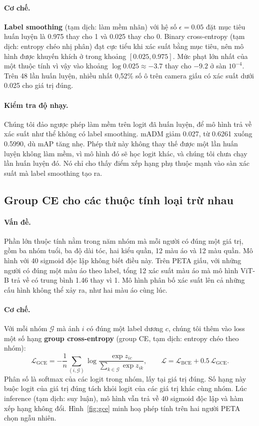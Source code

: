 \documentclass[11pt,a4paper]{article}
\begin{document}
\paragraph{Cơ chế.} \textbf{Label smoothing} (tạm dịch: làm mềm nhãn) với hệ số $\epsilon=0.05$ đặt mục tiêu huấn luyện là 0.975 thay cho 1 và 0.025 thay cho 0. Binary cross-entropy (tạm dịch: entropy chéo nhị phân) đạt cực tiểu khi xác suất bằng mục tiêu, nên mô hình được khuyến khích ở trong khoảng $[0.025, 0.975]$. Mức phạt lớn nhất của một thuộc tính vì vậy vào khoảng $\log 0.025\approx-3.7$ thay cho $-9.2$ ở sàn $10^{-4}$. Trên 48 lần huấn luyện, nhiều nhất 0,52\% số ô trên camera giấu có xác suất dưới 0.025 cho giá trị đúng.

\paragraph{Kiểm tra độ nhạy.} Chúng tôi đảo ngược phép làm mềm trên logit đã huấn luyện, để mô hình trả về xác suất như thể không có label smoothing. mADM giảm 0.027, từ 0.6261 xuống 0.5990, dù mAP tăng nhẹ. Phép thử này không thay thế được một lần huấn luyện không làm mềm, vì mô hình đó sẽ học logit khác, và chúng tôi chưa chạy lần huấn luyện đó. Nó chỉ cho thấy điểm xếp hạng phụ thuộc mạnh vào sàn xác suất mà label smoothing tạo ra.

\subsection{Group CE cho các thuộc tính loại trừ nhau}
\label{sec:gce}

\paragraph{Vấn đề.} Phần lớn thuộc tính nằm trong năm nhóm mà mỗi người có đúng một giá trị, gồm ba nhóm tuổi, ba độ dài tóc, hai kiểu quần, 12 màu áo và 12 màu quần. Mô hình với 40 sigmoid độc lập không biết điều này. Trên PETA giấu, với những người có đúng một màu áo theo label, tổng 12 xác suất màu áo mà mô hình ViT-B trả về có trung bình 1.46 thay vì 1. Mô hình phân bố xác suất lên cả những cấu hình không thể xảy ra, như hai màu áo cùng lúc.

\paragraph{Cơ chế.} Với mỗi nhóm $\mathcal{G}$ mà ảnh $i$ có đúng một label dương $c$, chúng tôi thêm vào loss một số hạng \textbf{group cross-entropy} (group CE, tạm dịch: entropy chéo theo nhóm):
\begin{equation}
\mathcal{L}_{\text{GCE}}=-\frac{1}{n}\sum_{(i,\mathcal{G})}\log\frac{\exp z_{ic}}{\sum_{k\in\mathcal{G}}\exp z_{ik}},\qquad \mathcal{L}=\mathcal{L}_{\text{BCE}}+0.5\,\mathcal{L}_{\text{GCE}}.
\end{equation}
Phân số là softmax của các logit trong nhóm, lấy tại giá trị đúng. Số hạng này buộc logit của giá trị đúng tách khỏi logit của các giá trị khác cùng nhóm. Lúc inference (tạm dịch: suy luận), mô hình vẫn trả về 40 sigmoid độc lập và hàm xếp hạng không đổi. Hình~\ref{fig:gce} minh hoạ phép tính trên hai người PETA chọn ngẫu nhiên.
\end{document}
